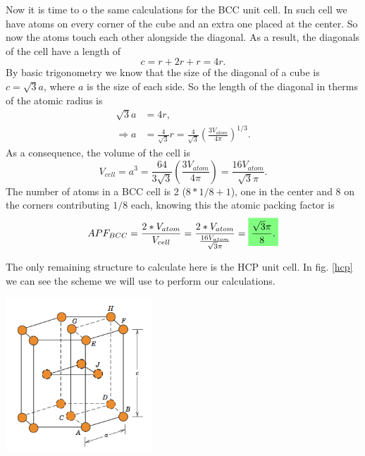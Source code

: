 \begin{questions}
\begin{solution}
  Now it is time to o the same calculations for the BCC unit cell. In such cell we have atoms on every corner of the cube and an extra one placed at the center. So now the atoms touch each other alongside the diagonal. As a result, the diagonals of the cell have a length of
  \begin{equation*}
    c = r + 2r + r = 4r.
  \end{equation*}
  By basic trigonometry we know that the size of the diagonal of a cube is $c = \sqrt{3} a$, where $a$ is the size of each side. So the length of the diagonal in therms of the atomic radius is
  \begin{equation}
    \begin{aligned}
      \sqrt{3} a &= 4 r,\\
      \Rightarrow a &= \frac{4}{\sqrt{3}}r = \frac{4}{\sqrt{3}}\left(\frac{3V_{atom}}{4\pi}\right)^{1/3}.
    \end{aligned}
  \end{equation}
  As a consequence, the volume of the cell is
  \begin{equation}
    V_{cell} = a^3 = \frac{64}{3\sqrt{3}}\left(\frac{3V_{atom}}{4\pi}\right) = \frac{16V_{atom}}{\sqrt{3}\pi}.
  \end{equation}
  The number of atoms in a BCC cell is 2 ($8*1/8 + 1$), one in the center and 8 on the corners contributing $1/8$ each, knowing this the atomic packing factor is
  \begin{equation}
    APF_{BCC} = \frac{2*V_{atom}}{V_{cell}} = \frac{2*V_{atom}}{\frac{16V_{atom}}{\sqrt{3}\pi}} = \hlgreen{\frac{\sqrt{3}\pi}{8}.}
  \end{equation}
\end{solution}

\begin{solution}
The only remaining structure to calculate here is the HCP unit cell. In fig. \ref{hcp} we can see the scheme we will use to perform our calculations.
  \begin{center}
    \includegraphics[width=55mm]{hpc}
  \end{center}


\end{solution}
\end{questions}
